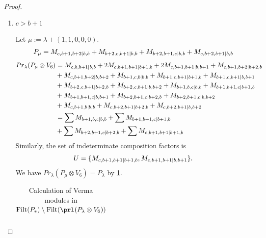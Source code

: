 \begin{proof}
\begin{enumerate}
\begin{enumerate}
\begin{enumerate}
            \item $ c > b+1 $ \par
        Let $\mu:=\lambda + (1,1,0,0,0) $.
        \begin{equation}\notag
          \begin{aligned}
            P_\mu = M_{c,b+1,b+2|b,b}
+ M_{b+2,c,b+1|b,b}
+ M_{b+2,b+1,c|b,b}
+ M_{c,b+2,b+1|b,b}
          \end{aligned}
        \end{equation}
        \begin{equation}\notag
          \begin{aligned}
            Pr_{\lambda}(P_\mu \otimes V_{6}) &=
M_{c,b,b+1|b,b}
+ 2M_{c,b+1,b+1|b+1,b}
+ 2M_{c,b+1,b+1|b,b+1}
+ M_{c,b+1,b+2|b+2,b}\\
                                               &
+ M_{c,b+1,b+2|b,b+2}
+ M_{b+1,c,b|b,b}
+ M_{b+1,c,b+1|b+1,b}
+ M_{b+1,c,b+1|b,b+1}\\
                                               &
+ M_{b+2,c,b+1|b+2,b}
+ M_{b+2,c,b+1|b,b+2}
+ M_{b+1,b,c|b,b}
+ M_{b+1,b+1,c|b+1,b}\\
                                               &
+ M_{b+1,b+1,c|b,b+1}
+ M_{b+2,b+1,c|b+2,b}
+ M_{b+2,b+1,c|b,b+2}\\
                                               &
+ M_{c,b+1,b|b,b}
+ M_{c,b+2,b+1|b+2,b}
+ M_{c,b+2,b+1|b,b+2} \\
                                               &=
\sum M_{b+1,b,c|b,b}
+ \sum M_{b+1,b+1,c|b+1,b}\\
                                               &
+ \sum M_{b+2,b+1,c|b+2,b}
+ \sum M_{c,b+1,b+1|b+1,b}
          \end{aligned}
        \end{equation}
      Similarly, the set of indeterminate composition factors is 
\begin{equation}\notag
  \begin{aligned}
    U = \{
M_{c,b+1,b+1|b+1,b},
M_{c,b+1,b+1|b,b+1}
\}.
  \end{aligned}
\end{equation}
       We have $Pr_{\lambda}(P_\mu \otimes V_{6}) = P_\lambda  $ by \cref{tab:verma-analysis_1_a_10}.
\begin{table}[htbp]
\centering
\caption{Calculation of Verma modules in $\operatorname{Filt}(P_*) \setminus \operatorname{Filt}(\prl(P_\lambda \otimes V_{6})) $ } \label{tab:verma-analysis_1_a_10}
\begin{tabular}{cc}

\end{tabular}
\end{table}
\end{enumerate}
\end{enumerate}
\end{enumerate}
\end{proof}
